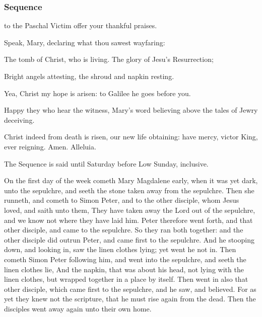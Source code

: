\clearpage
{}

\subsubsection{Sequence}\label{PaschalSequence}
 to the Paschal Victim offer your thankful praises.\par
{}
Speak, Mary, declaring what thou sawest wayfaring:\par
The tomb of Christ, who is living. The glory of Jesu's Resurrection;\par
Bright angels attesting, the shroud and napkin resting.\par
Yea, Christ my hope is arisen: to Galilee he goes before you.\par
Happy they who hear the witness, Mary's word believing above the tales of Jewry deceiving.\par
Christ indeed from death is risen, our new life obtaining: have mercy, victor King, ever reigning. Amen. Alleluia.
\begin{rubric}
     The Sequence is said until Saturday before Low Sunday, inclusive.
\end{rubric}

 On the first day of the week cometh Mary Magdalene early, when it was yet dark, unto the sepulchre, and seeth the stone taken away from the sepulchre. Then she runneth, and cometh to Simon Peter, and to the other disciple, whom Jesus loved, and saith unto them, They have taken away the Lord out of the sepulchre, and we know not where they have laid him. Peter therefore went forth, and that other disciple, and came to the sepulchre. So they ran both together: and the other disciple did outrun Peter, and came first to the sepulchre. And he stooping down, and looking in, saw the linen clothes lying; yet went he not in. Then cometh Simon Peter following him, and went into the sepulchre, and seeth the linen clothes lie, And the napkin, that was about his head, not lying with the linen clothes, but wrapped together in a place by itself. Then went in also that other disciple, which came first to the sepulchre, and he saw, and believed. For as yet they knew not the scripture, that he must rise again from the dead. Then the disciples went away again unto their own home.

